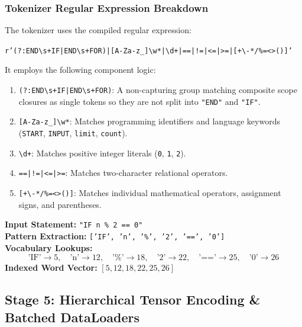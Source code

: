 \documentclass[11pt,a4paper]{article}
\begin{document}
\subsubsection{Tokenizer Regular Expression Breakdown}
The tokenizer uses the compiled regular expression:
\begin{center}
\small\texttt{r'(?:END\textbackslash s+IF|END\textbackslash s+FOR)|[A-Za-z\_]\textbackslash w*|\textbackslash d+|==|!=|<=|>=|[+\textbackslash-*/\%=<>()]'}
\end{center}
It employs the following component logic:
\begin{enumerate}
    \item \texttt{(?:END\textbackslash s+IF|END\textbackslash s+FOR)}: A non-capturing group matching composite scope closures as single tokens so they are not split into \texttt{"END"} and \texttt{"IF"}.
    \item \texttt{[A-Za-z\_]\textbackslash w*}: Matches programming identifiers and language keywords (\texttt{START}, \texttt{INPUT}, \texttt{limit}, \texttt{count}).
    \item \texttt{\textbackslash d+}: Matches positive integer literals (\texttt{0}, \texttt{1}, \texttt{2}).
    \item \texttt{==|!=|<=|>=}: Matches two-character relational operators.
    \item \texttt{[+\textbackslash-*/\%=<>()]}: Matches individual mathematical operators, assignment signs, and parentheses.
\end{enumerate}

\begin{nlpexample}
\textbf{Input Statement:} \texttt{"IF n \% 2 == 0"}\\
\textbf{Pattern Extraction:} \texttt{['IF', 'n', '\%', '2', '==', '0']}\\
\textbf{Vocabulary Lookups:}
\[
\text{'IF'} \to 5,\quad \text{'n'} \to 12,\quad \text{'\%'} \to 18,\quad \text{'2'} \to 22,\quad \text{'=='} \to 25,\quad \text{'0'} \to 26
\]
\textbf{Indexed Word Vector:} $[5, 12, 18, 22, 25, 26]$
\end{nlpexample}

\subsection{Stage 5: Hierarchical Tensor Encoding \& Batched DataLoaders}
\end{document}
